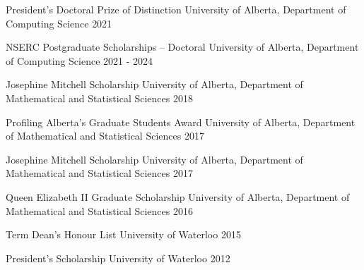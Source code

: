 \begin{cvhonors}

  \cvhonor
    {President’s Doctoral Prize of Distinction}
    {University of Alberta, Department of Computing Science}
    {2021}

  \cvhonor
    {NSERC Postgraduate Scholarships – Doctoral}
    {University of Alberta, Department of Computing Science}
    {2021 - 2024}

  \cvhonor
    {Josephine Mitchell Scholarship}
    {University of Alberta, Department of Mathematical and Statistical Sciences}
    {2018}

  \cvhonor
    {Profiling Alberta's Graduate Students Award}
    {University of Alberta, Department of Mathematical and Statistical Sciences}
    {2017}

  \cvhonor
    {Josephine Mitchell Scholarship}
    {University of Alberta, Department of Mathematical and Statistical Sciences}
    {2017}

  \cvhonor
    {Queen Elizabeth II Graduate Scholarship}
    {University of Alberta, Department of Mathematical and Statistical Sciences}
    {2016}

  \cvhonor
    {Term Dean's Honour List}
    {University of Waterloo}
    {2015}

  \cvhonor
    {President's Scholarship}
    {University of Waterloo}
    {2012}

\end{cvhonors}

